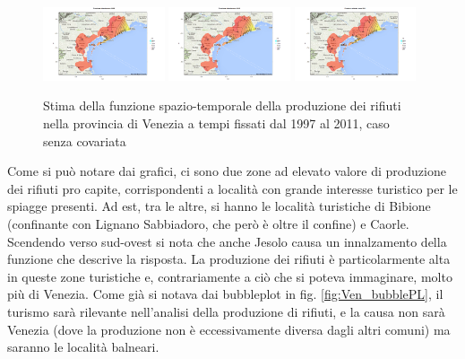 \documentclass[a4paper,11pt,twoside,openright]{book}							%
\begin{document}
\begin{figure}[H]
	\includegraphics[trim=0cm 0cm 4cm 0cm,clip=true,width=0.32\textwidth]{Immagini/venezia_senza_covariate/Maps2009.png}
	\includegraphics[trim=0cm 0cm 4cm 0cm,clip=true,width=0.32\textwidth]{Immagini/venezia_senza_covariate/Maps2010.png}
	\includegraphics[trim=0cm 0cm 4cm 0cm,clip=true,width=0.32\textwidth]{Immagini/venezia_senza_covariate/Maps2011.png}
	\caption{Stima della funzione spazio-temporale della produzione dei rifiuti nella provincia di Venezia a tempi fissati dal 1997 al 2011, caso senza covariata}
	\label{fig:Ven_ris}
\end{figure}
\newpage
Come si può notare dai grafici, ci sono due zone ad elevato valore di produzione dei rifiuti pro capite, corrispondenti a località con grande interesse turistico per le spiagge presenti. Ad est, tra le altre, si hanno le località turistiche di Bibione (confinante con Lignano Sabbiadoro, che però è oltre il confine) e Caorle. Scendendo verso sud-ovest si nota che anche Jesolo causa un innalzamento della funzione che descrive la risposta. La produzione dei rifiuti è particolarmente alta in queste zone turistiche e, contrariamente a ciò che si poteva immaginare, molto più di Venezia. Come già si notava dai bubbleplot in fig. \ref{fig:Ven_bubblePL}, il turismo sarà rilevante nell'analisi della produzione di rifiuti, e la causa non sarà Venezia (dove la produzione non è eccessivamente diversa dagli altri comuni) ma saranno le località balneari.
\end{document}
